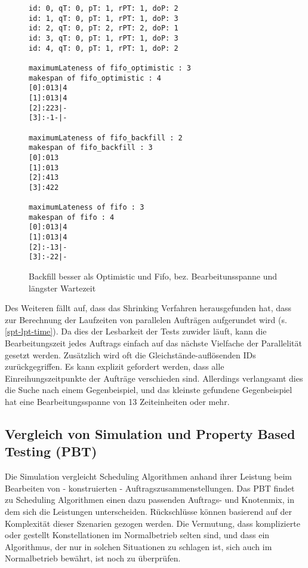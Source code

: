 \begin{figure}
	\centering
	\begin{verbatim}
id: 0, qT: 0, pT: 1, rPT: 1, doP: 2
id: 1, qT: 0, pT: 1, rPT: 1, doP: 3
id: 2, qT: 0, pT: 2, rPT: 2, doP: 1
id: 3, qT: 0, pT: 1, rPT: 1, doP: 3
id: 4, qT: 0, pT: 1, rPT: 1, doP: 2

maximumLateness of fifo_optimistic : 3
makespan of fifo_optimistic : 4
[0]:013|4
[1]:013|4
[2]:223|-
[3]:-1-|-

maximumLateness of fifo_backfill : 2
makespan of fifo_backfill : 3
[0]:013
[1]:013
[2]:413
[3]:422

maximumLateness of fifo : 3
makespan of fifo : 4
[0]:013|4
[1]:013|4
[2]:-13|-
[3]:-22|-
\end{verbatim}
\caption{Backfill besser als Optimistic und Fifo, bez. Bearbeitunsspanne und längster Wartezeit}
\label{everything}
\end{figure}

Des Weiteren fällt auf, dass das Shrinking Verfahren herausgefunden hat, dass zur Berechnung der Laufzeiten von parallelen Aufträgen aufgerundet wird (s. \ref{spt-lpt-time}). Da dies der Lesbarkeit der Tests zuwider läuft, kann die Bearbeitungszeit jedes Auftrags einfach auf das nächste Vielfache der Parallelität gesetzt werden.
Zusätzlich wird oft die Gleichstände-auflösenden IDs zurückgegriffen. Es kann explizit gefordert werden, dass alle Einreihungszeitpunkte der Aufträge verschieden sind. Allerdings verlangsamt dies die Suche nach einem Gegenbeispiel, und das kleinste gefundene Gegenbeispiel hat eine Bearbeitungsspanne von 13 Zeiteinheiten oder mehr.\\
\FloatBarrier

\subsection{Vergleich von Simulation und Property Based Testing (PBT)}
\label{prop-sim}
Die Simulation vergleicht Scheduling Algorithmen anhand ihrer Leistung beim Bearbeiten von -  konstruierten - Auftragszusammenstellungen. Das PBT findet zu Scheduling Algorithmen einen dazu passenden Auftrags- und Knotenmix, in dem sich die Leistungen unterscheiden. Rückschlüsse können basierend auf der Komplexität dieser Szenarien gezogen werden. Die Vermutung, dass komplizierte oder gestellt Konstellationen im Normalbetrieb selten sind, und dass ein Algorithmus, der nur in solchen Situationen zu schlagen ist, sich auch im Normalbetrieb bewährt, ist noch zu überprüfen.\\

